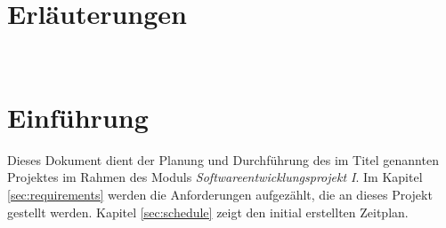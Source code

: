 \section*{Erläuterungen}
\\

\section*{Einführung}

Dieses Dokument dient der Planung und Durchführung des im Titel genannten Projektes im Rahmen des Moduls \glqq{}\emph{Softwareentwicklungsprojekt I}\grqq{}.
Im Kapitel \ref{sec:requirements} werden die Anforderungen aufgezählt, die an dieses Projekt gestellt werden.
Kapitel \ref{sec:schedule} zeigt den initial erstellten Zeitplan.

